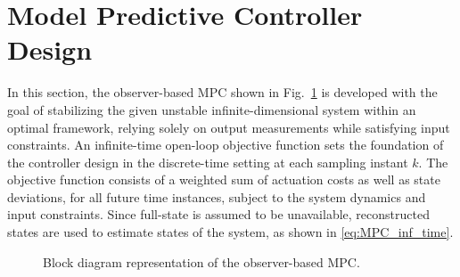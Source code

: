 \section{Model Predictive Controller Design}
In this section, the observer-based MPC shown in Fig.~\ref{fig:block_diagram} is developed with the goal of stabilizing the given unstable infinite-dimensional system within an optimal framework, relying solely on output measurements while satisfying input constraints. 
An infinite-time open-loop objective function sets the foundation of the controller design in the discrete-time setting at each sampling instant $k$. The objective function consists of a weighted sum of actuation costs as well as state deviations, for all future time instances, subject to the system dynamics and input constraints. Since full-state is assumed to be unavailable, reconstructed states are used to estimate states of the system, as shown in \eqref{eq:MPC_inf_time}.
\begin{figure}[!htbp]
    \centering
    \caption{Block diagram representation of the observer-based MPC.}
    \label{fig:block_diagram}
\end{figure}

